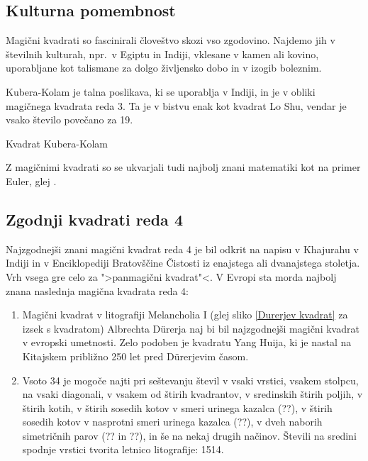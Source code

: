 \documentclass[a4paper,12pt]{article}
\theoremstyle{definition}
\theoremstyle{plain}
\theoremstyle{plain}
\begin{document}

\subsection{Kulturna pomembnost}

Magični kvadrati so fascinirali človeštvo skozi vso zgodovino. Najdemo jih
v številnih kulturah, npr.\ v Egiptu in Indiji, vklesane v kamen ali
kovino, uporabljane kot talismane za dolgo življensko dobo in v
izogib boleznim.

Kubera-Kolam je talna poslikava, ki se uporablja v Indiji, in je v
obliki magičnega kvadrata reda 3. Ta je v bistvu enak kot kvadrat
Lo Shu, vendar je vsako število povečano za 19.

Kvadrat Kubera-Kolam

Z magičnimi kvadrati so se ukvarjali tudi najbolj znani matematiki kot na
primer Euler, glej \cite{euler}.


\subsection{Zgodnji kvadrati reda 4}

Najzgodnejši znani magični kvadrat reda 4 je bil odkrit na napisu
v Khajurahu v Indiji in v Enciklopediji Bratovščine Čistosti iz enajstega
ali dvanajstega stoletja. Vrh vsega gre celo za ">panmagični kvadrat"<.
V Evropi sta morda najbolj znana naslednja magična kvadrata reda 4:
\begin{enumerate}
   \item Magični kvadrat v litografiji Melancholia I (glej sliko \ref{Durerjev kvadrat}
   za izsek s kvadratom) Albrechta Dürerja naj bi bil najzgodnejši magični kvadrat
   v evropski umetnosti. Zelo podoben je kvadratu Yang Huija, ki je nastal na Kitajskem
   približno 250 let pred Dürerjevim časom.
   
   \item Vsoto 34 je mogoče najti pri seštevanju števil v vsaki vrstici, vsakem stolpcu,
   na vsaki diagonali, v vsakem od štirih kvadrantov, v sredinskih štirih poljih,
   v štirih kotih, v štirih sosedih kotov v smeri urinega kazalca (??), v
   štirih sosedih kotov v nasprotni smeri urinega kazalca (??), v dveh naborih
   simetričnih parov (?? in ??), in še na nekaj drugih načinov.
   Števili na sredini spodnje vrstici tvorita letnico litografije: 1514.
\end{enumerate}
   
\end{document}

